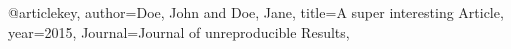 @article{key,
    author={Doe, John and Doe, Jane},
    title={A super interesting Article},
    year={2015},
    Journal={Journal of unreproducible Results},    
}